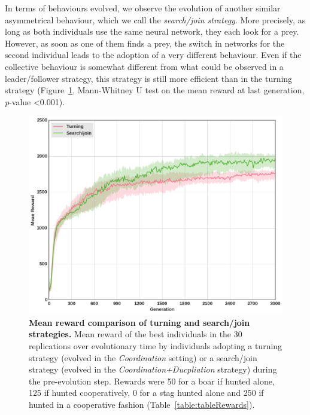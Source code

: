     In terms of behaviours evolved, we observe the evolution of another similar asymmetrical behaviour, which we call the \emph{search/join strategy}. More precisely, as long as both individuals use the same neural network, they each look for a prey. However, as soon as one of them finds a prey, the switch in networks for the second individual leads to the adoption of a very different behaviour. Even if the collective behaviour is somewhat different from what could be observed in a leader/follower strategy, this strategy is still more efficient than in the turning strategy (Figure~\ref{fig:fitnessRecyclingComNN}, Mann-Whitney U test on the mean reward at last generation, {\em p}-value \textless 0.001).

    \begin{figure}[h]
      \centering
        \includegraphics[width=0.7\linewidth]{fig/ArticleBio2/Fig8.png}
        \caption{\textbf{Mean reward comparison of turning and search/join strategies.}
        Mean reward of the best individuals in the $30$ replications over evolutionary time by individuals adopting a turning strategy (evolved in the \emph{Coordination} setting) or a search/join strategy (evolved in the \emph{Coordination+Ducpliation} strategy) during the pre-evolution step. Rewards were 50 for a boar if hunted alone, 125 if hunted cooperatively, 0 for a stag hunted alone and 250 if hunted in a cooperative fashion (Table~\ref{table:tableRewards}).}
      \label{fig:fitnessRecyclingComNN}
    \end{figure} 



